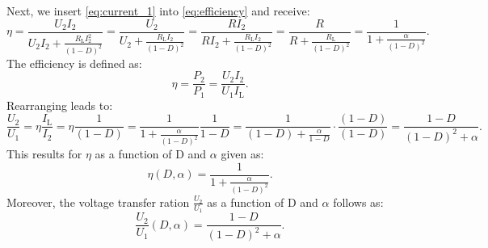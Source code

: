 \begin{solutionblock}
\begin{equation}
\end{equation}
Next, we insert \eqref{eq:current_1} into \eqref{eq:efficiency} and receive:
\begin{equation}
    \eta=\frac{U_\mathrm{2}I_\mathrm{2}}{U_\mathrm{2}I_\mathrm{2}+\frac{ R_\mathrm{L}I_\mathrm{2}^2}{(1-D)^2}}=\frac{U_\mathrm{2}}{U_\mathrm{2}+\frac{ R_\mathrm{L}I_\mathrm{2}}{(1-D)^2}}=\frac{RI_\mathrm{2}}{RI_\mathrm{2}+\frac{ R_\mathrm{L}I_\mathrm{2}}{(1-D)^2}}=\frac{R}{R+\frac{ R_\mathrm{L}}{(1-D)^2}}=\frac{1}{1+\frac{\alpha}{(1-D)^2}}.
    \label{eq:efficiencyOverD}
\end{equation}
The efficiency is defined as:
\begin{equation}
    \eta=\frac{P_\mathrm{2}}{P_\mathrm{1}} = \frac{U_\mathrm{2}I_\mathrm{2}}{U_\mathrm{1}I_\mathrm{L}}.
\end{equation}
Rearranging leads to:
\begin{equation}
    \frac{U_\mathrm{2}}{U_\mathrm{1}}=\eta \frac{I_\mathrm{L}}{I_\mathrm{2}}= \eta \frac{1}{(1-D)}=\frac{1}{1+\frac{\alpha}{(1-D)^2}}\frac{1}{1-D}=\frac{1}{(1-D)+\frac{\alpha}{1-D}}\cdot \frac{(1-D)}{(1-D)}=\frac{1-D}{(1-D)^2+\alpha}.
    \label{eq:voltageRatioOverD}
\end{equation}
This results for $\eta$ as a function of D and $\alpha$ given as:
\begin{equation}
    \eta(D,\alpha)=\frac{1}{1+\frac{\alpha}{(1-D)^2}}.
\end{equation}
Moreover, the voltage transfer ration $\frac{U_\mathrm{2}}{U_\mathrm{1}}$ as a function of D and $\alpha$ follows as:
\begin{equation}
    \frac{U_\mathrm{2}}{U_\mathrm{1}}(D,\alpha)=\frac{1-D}{(1-D)^2+\alpha}.
\end{equation}
\end{solutionblock}

